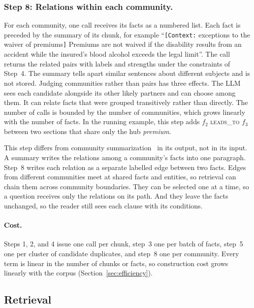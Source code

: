 \documentclass[sigconf, review, anonymous]{acmart}
\newcommand{\rel}[1]{\textsc{#1}}            %
\begin{document}
\subsubsection*{Step 8: Relations within each community.}
For each community, one call receives its facts as a numbered list. Each fact is preceded by the summary of its chunk, for example ``\texttt{[Context:} exceptions to the waiver of premiums\texttt{]} Premiums are not waived if the disability results from an accident while the insured's blood alcohol exceeds the legal limit''. The call returns the related pairs with labels and strengths under the constraints of Step~4. The summary tells apart similar sentences about different subjects and is not stored. Judging communities rather than pairs has three effects. The LLM sees each candidate alongside its other likely partners and can choose among them. It can relate facts that were grouped transitively rather than directly. The number of calls is bounded by the number of communities, which grows linearly with the number of facts. In the running example, this step adds $f_2$ \rel{leads\_to} $f_3$ between two sections that share only the hub \emph{premium}.

This step differs from community summarization~\cite{edge2024local,zhong2026hygrag} in its output, not in its input. A summary writes the relations among a community's facts into one paragraph. Step~8 writes each relation as a separate labelled edge between two facts. Edges from different communities meet at shared facts and entities, so retrieval can chain them across community boundaries. They can be selected one at a time, so a question receives only the relations on its path. And they leave the facts unchanged, so the reader still sees each clause with its conditions.

\paragraph{\textbf{Cost.}}
Steps 1, 2, and 4 issue one call per chunk, step~3 one per batch of facts, step~5 one per cluster of candidate duplicates, and step~8 one per community. Every term is linear in the number of chunks or facts, so construction cost grows linearly with the corpus (Section~\ref{sec:efficiency}).

\subsection{Retrieval}
\label{sec:retrieval}
\end{document}

